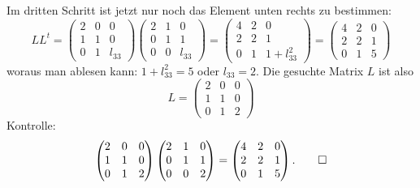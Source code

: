 \begin{loesung}
Im dritten Schritt ist jetzt nur noch das Element unten rechts zu bestimmen:
\[
LL^t=
\begin{pmatrix}
2&0&     0\\
1&1&     0\\
0&1&l_{33}
\end{pmatrix}
\begin{pmatrix}
2&1&     0\\
0&1&     1\\
0&0&l_{33}
\end{pmatrix}
=
\begin{pmatrix}
4&2&0\\
2&2&1\\
0&1&1+l_{33}^2
\end{pmatrix}
=
\begin{pmatrix}
4&2&0\\
2&2&1\\
0&1&5
\end{pmatrix}
\]
woraus man ablesen kann: $1+l_{33}^2=5$ oder $l_{33}=2$. Die gesuchte
Matrix $L$ ist also
\[
L=
\begin{pmatrix}
2&0&0\\
1&1&0\\
0&1&2
\end{pmatrix}
\]
Kontrolle:
\[
\begin{pmatrix}
2&0&0\\
1&1&0\\
0&1&2
\end{pmatrix}
\begin{pmatrix}
2&1&0\\
0&1&1\\
0&0&2
\end{pmatrix}
=
\begin{pmatrix}
4&2&0\\
2&2&1\\
0&1&5
\end{pmatrix}.
\qedhere
\]
\end{loesung}

